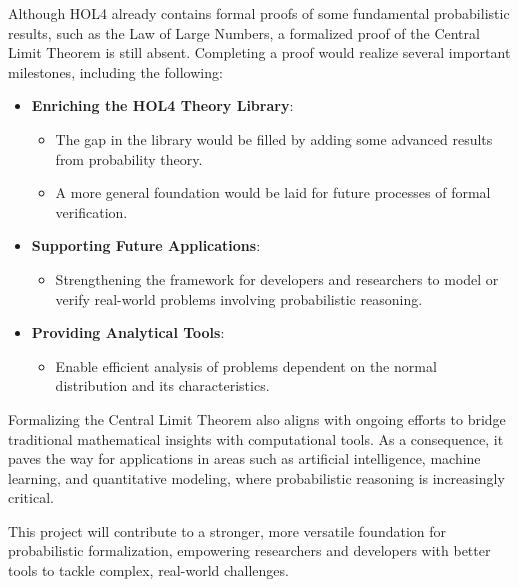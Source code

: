 Although HOL4 already contains formal proofs of some fundamental probabilistic results, such as the Law of Large Numbers, a formalized proof of the Central Limit Theorem is still absent. Completing a proof would realize several important milestones, including the following:

\begin{itemize}
    \item \textbf{Enriching the HOL4 Theory Library}:
    \begin{itemize}
        \item The gap in the library would be filled by adding some advanced results from probability theory.
        \item A more general foundation would be laid for future processes of formal verification.
    \end{itemize}
    \item \textbf{Supporting Future Applications}:
    \begin{itemize}
        \item Strengthening the framework for developers and researchers to model or verify real-world problems involving probabilistic reasoning.
    \end{itemize}
    \item \textbf{Providing Analytical Tools}:
        \begin{itemize}
            \item Enable efficient analysis of problems dependent on the normal distribution and its characteristics.
        \end{itemize}
\end{itemize}

Formalizing the Central Limit Theorem also aligns with ongoing efforts to bridge traditional mathematical insights with computational tools. As a consequence, it paves the way for applications in areas such as artificial intelligence, machine learning, and quantitative modeling, where probabilistic reasoning is increasingly critical.

This project will contribute to a stronger, more versatile foundation for probabilistic formalization, empowering researchers and developers with better tools to tackle complex, real-world challenges.
